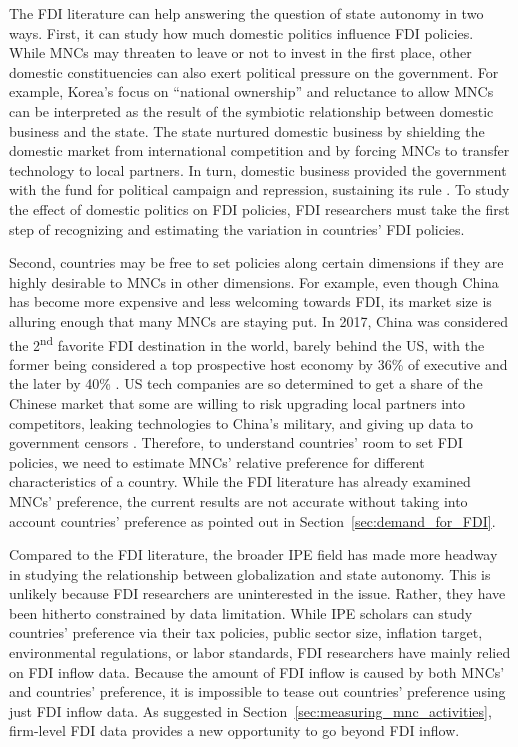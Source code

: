 The FDI literature can help answering the question of state autonomy in two
ways. First, it can study how much domestic politics influence FDI policies.
While MNCs may threaten to leave or not to invest in the first place, other
domestic constituencies can also exert political pressure on the government. For
example, Korea's focus on ``national ownership'' and reluctance to allow MNCs
can be interpreted as the result of the symbiotic relationship between domestic
business and the state. The state nurtured domestic business by shielding the
domestic market from international competition and by forcing MNCs to transfer
technology to local partners. In turn, domestic business provided the government
with the fund for political campaign and repression, sustaining its rule
\citep[ch 4]{Kang2002}. To study the effect of domestic politics on FDI
policies, FDI researchers must take the first step of recognizing and estimating
the variation in countries' FDI policies.

Second, countries may be free to set policies along certain dimensions if they
are highly desirable to MNCs in other dimensions. For example, even though China
has become more expensive and less welcoming towards FDI, its market size is
alluring enough that many MNCs are staying put. In 2017, China was considered
the 2\textsuperscript{nd} favorite FDI destination in the world, barely behind
the US, with the former being considered a top prospective host economy by 36\%
of executive and the later by 40\% \citep[Fig I.8]{UNCTAD2017}. US tech
companies are so determined to get a share of the Chinese market that some are
willing to risk upgrading local partners into competitors, leaking technologies
to China's military, and giving up data to government censors \citep{Dou2015,
  Rauhala2016}. Therefore, to understand countries' room to set FDI policies, we
need to estimate MNCs' relative preference for different characteristics of a
country. While the FDI literature has already examined MNCs' preference, the
current results are not accurate without taking into account countries'
preference as pointed out in Section~\ref{sec:demand_for_FDI}.

Compared to the FDI literature, the broader IPE field has made more headway in
studying the relationship between globalization and state autonomy. This is
unlikely because FDI researchers are uninterested in the issue. Rather, they
have been hitherto constrained by data limitation. While IPE scholars can study
countries' preference via their tax policies, public sector size, inflation
target, environmental regulations, or labor standards, FDI researchers have
mainly relied on FDI inflow data. Because the amount of FDI inflow is caused by
both MNCs' and countries' preference, it is impossible to tease out countries'
preference using just FDI inflow data. As suggested in
Section~\ref{sec:measuring_mnc_activities}, firm-level FDI data provides a new
opportunity to go beyond FDI inflow.

